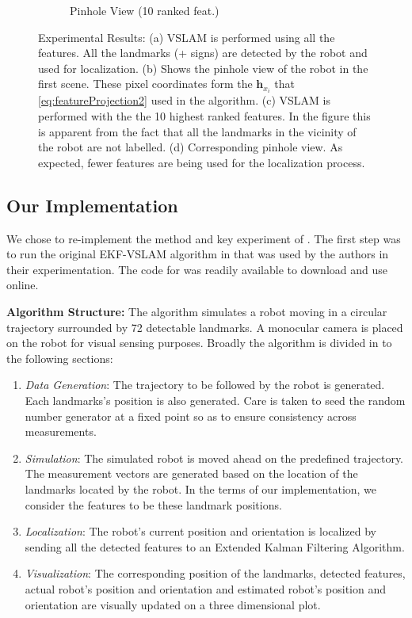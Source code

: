 \documentclass[10pt,twocolumn,letterpaper]{article}
\begin{document}
\begin{figure}[t!]
\begin{subfigure}[b]{0.25\textwidth}
                \caption{Pinhole View (10 ranked feat.)}
                \label{fig:mouse}
        \end{subfigure}
        \caption{Experimental Results: (a) VSLAM is performed using all the features. All the landmarks (+ signs) are detected by the robot and used for localization. (b) Shows the pinhole view of the robot in the first scene. These pixel coordinates form the $\boldsymbol{h}_{x_i}$ that \eqref{eq:featureProjection2} used in the algorithm. (c) VSLAM is performed with the the 10 highest ranked features. In the figure this is apparent from the fact that all the landmarks in the vicinity of the robot are not labelled. (d) Corresponding pinhole view. As expected, fewer features are being used for the localization process.}
\label{fig:animals}
\end{figure}

\subsection{Our Implementation}
We chose to re-implement the method and key experiment of \cite{Zhang_2015_CVPR}. The first step was to run the original EKF-VSLAM algorithm in \cite{31} that was used by the authors in their experimentation. The code for \cite{31} was readily available to download and use online.

\textbf{Algorithm Structure:} The algorithm simulates a robot moving in a circular trajectory surrounded by 72 detectable landmarks. A monocular camera is placed on the robot for visual sensing purposes. Broadly the algorithm is divided in to the following sections:
\begin{enumerate}
  \item \textit{Data Generation}: The trajectory to be followed by the robot is generated. Each landmarks's position is also generated. Care is taken to seed the random number generator at a fixed point so as to ensure consistency across measurements.
  \item \textit{Simulation}: The simulated robot is moved ahead on the predefined trajectory. The measurement vectors are generated based on the location of the landmarks located by the robot. In the terms of our implementation, we consider the features to be these landmark positions. 
 \item \textit{Localization}: The robot's current position and orientation is localized by sending all the detected features to an Extended Kalman Filtering Algorithm.
\item \textit{Visualization}: The corresponding position of the landmarks, detected features, actual robot's position and orientation and estimated robot's position and orientation are visually updated on a three dimensional plot.
\end{enumerate}
\end{document}
